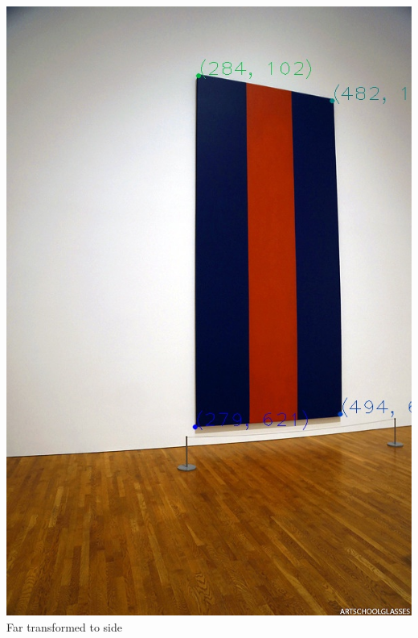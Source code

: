 \documentclass{article}
\begin{document}
\includegraphics[width=\linewidth]{./results/voices_of_fire/side.jpg}
Far transformed to side
\end{document}
